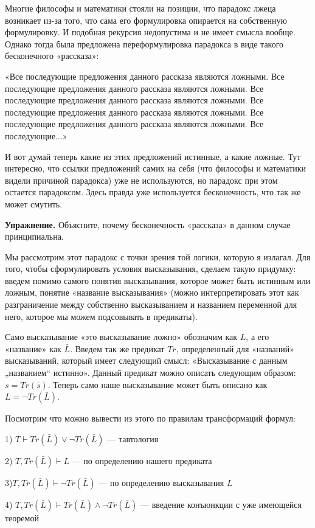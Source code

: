 Многие философы и математики стояли на позиции, что парадокс лжеца возникает из-за того, что сама его формулировка опирается на собственную формулировку. И подобная рекурсия недопустима и не имеет смысла вообще. Однако тогда была предложена переформулировка парадокса в виде такого бесконечного «рассказа»:

«Все последующие предложения данного рассказа являются ложными. Все последующие предложения данного рассказа являются ложными. Все последующие предложения данного рассказа являются ложными. Все последующие предложения данного рассказа являются ложными. Все последующие предложения данного рассказа являются ложными. Все последующие...»

И вот думай теперь какие из этих предложений истинные, а какие ложные. Тут интересно, что ссылки предложений самих на себя (что философы и математики видели причиной парадокса) уже не используются, но парадокс при этом остается парадоксом. Здесь правда уже используется бесконечность, что так же может смутить.

{\bfseries Упражнение.} Объясните, почему бесконечность «рассказа» в данном случае принципиальна.

Мы рассмотрим этот парадокс с точки зрения той логики, которую я излагал. Для того, чтобы сформулировать условия высказывания, сделаем такую придумку: введем помимо самого понятия высказывания, которое может быть истинным или ложным, понятие «название высказывания» (можно интерпретировать этот как разграничение между собственно высказыванием и названием переменной для него, которое мы можем подсовывать в предикаты).

Само высказывание «это высказывание ложно» обозначим как $L$, а его «название» как $\bar{L}$. Введем так же предикат $Tr$, определенный для «названий» высказываний, который имеет следующий смысл: «Высказывание с данным „названием“ истинно». Данный предикат можно описать следующим образом: $s = Tr(\bar{s})$. Теперь само наше высказывание может быть описано как $L = \neg Tr(\bar{L})$.

Посмотрим что можно вывести из этого по правилам трансформаций формул:

1) $T\vdash Tr(\bar{L})\vee\neg Tr(\bar{L})$ — тавтология

2) $T, Tr(\bar{L})\vdash L$ — по определению нашего предиката

3)$T, Tr(\bar{L})\vdash \neg Tr(\bar{L})$ — по определению высказывания $L$

4) $T, Tr(\bar{L})\vdash Tr(\bar{L})\wedge\neg Tr(\bar{L})$ — введение конъюнкции с уже имеющейся теоремой

